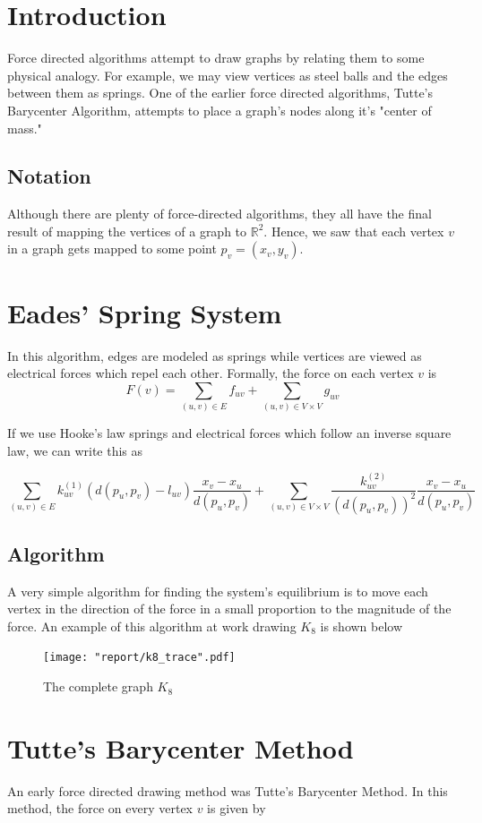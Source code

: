\documentclass[11pt]{report}
\begin{document}
\section{Introduction}
Force directed algorithms attempt to draw graphs by relating them to some physical analogy. For example, we may view vertices as steel balls and the edges between them as springs. One of the earlier force directed algorithms, Tutte's Barycenter Algorithm, attempts to place a graph's nodes along it's "center of mass."

\subsection{Notation}
Although there are plenty of force-directed algorithms, they all have the final result of mapping the vertices of a graph to $\mathbb{R}^2$. Hence, we saw that each vertex $v$ in a graph gets mapped to some point $p_v = (x_v, y_v)$. 

\section{Eades' Spring System}
In this algorithm, edges are modeled as springs while vertices are viewed as electrical forces which repel each other. Formally, the force on each vertex $v$ is 
\[
    F(v) = \sum_{(u, v) \in E} f_{uv} + \sum_{(u, v) \in V \times V} g_{uv}
\]

If we use Hooke's law springs and electrical forces which follow an inverse square law, we can write this as

\[
    \sum_{(u, v) \in E} k_{uv}^{(1)} ( d(p_u, p_v) - l_{uv} ) \frac{x_v - x_u}{d(p_u, p_v)} +
    \sum_{(u, v) \in V \times V} \frac{k_{uv}^{(2)}}{( d(p_u, p_v) )^2 }  \frac{x_v - x_u}{d(p_u, p_v)}
\]

\subsection{Algorithm}
A very simple algorithm for finding the system's equilibrium is to move each vertex in the direction of the force in a small proportion to the magnitude of the force. An example of this algorithm at work drawing $K_8$ is shown below

\begin{figure}[H]
    \centering
    \texttt{[image: "report/k8\_trace".pdf]}
    \caption{The complete graph $K_8$}
\end{figure}

\section{Tutte's Barycenter Method}
An early force directed drawing method was Tutte's Barycenter Method. In this method, the force on every vertex $v$ is given by 
\end{document}
